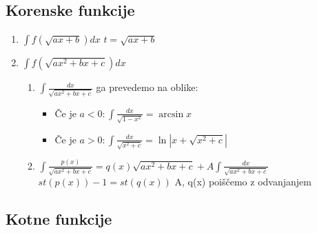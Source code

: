 \documentclass[a4paper,oneside,10pt]{article}
\theoremstyle{definition}
\newcommand\abs[1]{\left|#1\right|}
\begin{document}
\begin{multicols}{2}
	\subsection*{Korenske funkcije}
	\begin{enumerate}
		\item $\int f(\sqrt{ax + b})dx$ \qquad $t = \sqrt{ax + b}$\\
		\item $\int f(\sqrt{ax^2 + bx + c})dx$\\
		\begin{enumerate}[a]
			\item $\int \frac{dx}{\sqrt{ax^2 + bx + c}}$ ga prevedemo na oblike:
			\begin{itemize}
				\item Če je $a < 0: \int \frac{dx}{\sqrt{1-x^2}} = \arcsin{x}$
				\item Če je $a > 0: \int \frac{dx}{\sqrt{x^2 + c}} = \ln{\abs{x + \sqrt{x^2 + c}}}$
			\end{itemize}
			\item $\int \frac{p(x)}{\sqrt{ax^2 + bx + c}} = q(x)\sqrt{ax^2 + bx + c} + A\int\frac{dx}{\sqrt{ax^2 + bx + c}}$\\
			$st(p(x)) - 1 = st(q(x))$ \quad A, q(x) poiščemo z odvanjanjem
		
		\end{enumerate}
	\end{enumerate}
%
	\subsection*{Kotne funkcije}
	\begin{enumerate}


\end{enumerate}
\end{multicols}
\end{document}
